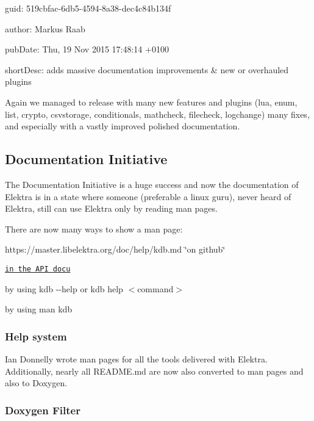 
\begin{DoxyItemize}
\item guid\+: 519cbfac-\/6db5-\/4594-\/8a38-\/dec4c84b134f
\item author\+: Markus Raab
\item pub\+Date\+: Thu, 19 Nov 2015 17\+:48\+:14 +0100
\item short\+Desc\+: adds massive documentation improvements \& new or overhauled plugins
\end{DoxyItemize}

Again we managed to release with many new features and plugins (lua, enum, list, crypto, csvstorage, conditionals, mathcheck, filecheck, logchange) many fixes, and especially with a vastly improved polished documentation.

\subsection*{Documentation Initiative}

The Documentation Initiative is a huge success and now the documentation of Elektra is in a state where someone (preferable a linux guru), never heard of Elektra, still can use Elektra only by reading man pages.

There are now many ways to show a man page\+:


\begin{DoxyItemize}
\item https\+://master.libelektra.\+org/doc/help/kdb.md \char`\"{}on github\char`\"{}
\item \href{https://doc.libelektra.org/api/latest/html/md_doc_help_kdb.html}{\tt in the A\+PI docu}
\item by using {\ttfamily kdb -\/-\/help} or {\ttfamily kdb help $<$command$>$}
\item by using {\ttfamily man kdb}
\end{DoxyItemize}

\subsubsection*{Help system}

Ian Donnelly wrote man pages for all the tools delivered with Elektra. Additionally, nearly all R\+E\+A\+D\+M\+E.\+md are now also converted to man pages and also to Doxygen.

\subsubsection*{Doxygen Filter}


